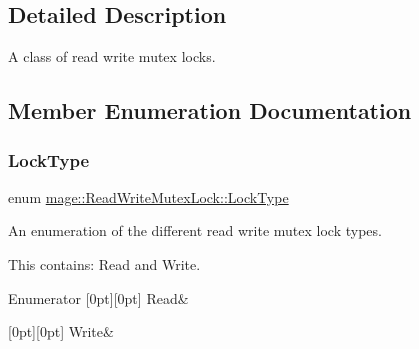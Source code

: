 \subsection{Detailed Description}
A class of read write mutex locks. 

\subsection{Member Enumeration Documentation}
\hypertarget{classmage_1_1_read_write_mutex_lock_a5fee0529edf58803ee1f5d4afa084a3b}{}\label{classmage_1_1_read_write_mutex_lock_a5fee0529edf58803ee1f5d4afa084a3b} 
\subsubsection{\texorpdfstring{Lock\+Type}{LockType}}
{\footnotesize\ttfamily enum \hyperlink{classmage_1_1_read_write_mutex_lock_a5fee0529edf58803ee1f5d4afa084a3b}{mage\+::\+Read\+Write\+Mutex\+Lock\+::\+Lock\+Type}\hspace{0.3cm}{\ttfamily [strong]}}

An enumeration of the different read write mutex lock types.

This contains\+: {\ttfamily Read} and {\ttfamily Write}. \begin{DoxyEnumFields}{Enumerator}
[0pt][0pt]{}\hypertarget{classmage_1_1_read_write_mutex_lock_a5fee0529edf58803ee1f5d4afa084a3ba7a1a5f3e79fdc91edf2f5ead9d66abb4}{}\label{classmage_1_1_read_write_mutex_lock_a5fee0529edf58803ee1f5d4afa084a3ba7a1a5f3e79fdc91edf2f5ead9d66abb4} 
Read&\\
\hline

[0pt][0pt]{}\hypertarget{classmage_1_1_read_write_mutex_lock_a5fee0529edf58803ee1f5d4afa084a3ba1129c0e4d43f2d121652a7302712cff6}{}\label{classmage_1_1_read_write_mutex_lock_a5fee0529edf58803ee1f5d4afa084a3ba1129c0e4d43f2d121652a7302712cff6} 
Write&\\
\hline

\end{DoxyEnumFields}


